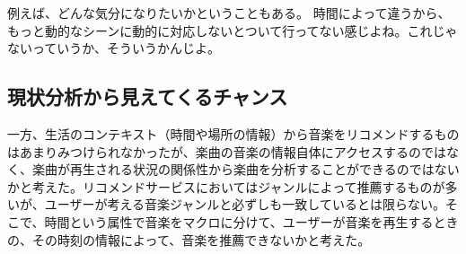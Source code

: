\documentclass{jsarticle}
\begin{document}
例えば、どんな気分になりたいかということもある。
時間によって違うから、もっと動的なシーンに動的に対応しないとついて行ってない感じよね。これじゃないっていうか、そういうかんじよ。

\subsection{現状分析から見えてくるチャンス}
一方、生活のコンテキスト（時間や場所の情報）から音楽をリコメンドするものはあまりみつけられなかったが、楽曲の音楽の情報自体にアクセスするのではなく、楽曲が再生される状況の関係性から楽曲を分析することができるのではないかと考えた。リコメンドサービスにおいてはジャンルによって推薦するものが多いが、ユーザーが考える音楽ジャンルと必ずしも一致しているとは限らない。そこで、時間という属性で音楽をマクロに分けて、ユーザーが音楽を再生するときの、その時刻の情報によって、音楽を推薦できないかと考えた。
\end{document}
